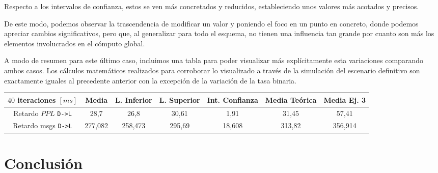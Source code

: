 \documentclass{article}[10pt]
\begin{document}
		Respecto a los intervalos de confianza, estos se ven más concretados y reducidos, estableciendo unos valores más acotados y precisos.

		De este modo, podemos observar la trascendencia de modificar un valor y poniendo el foco en un punto en concreto, donde podemos apreciar cambios significativos, pero que, al generalizar para todo el esquema, no tienen una influencia tan grande por cuanto son más los elementos involucrados en el cómputo global.

		A modo de resumen para este último caso, incluimos una tabla para poder visualizar más explícitamente esta variaciones comparando ambos casos. Los cálculos matemáticos realizados para corroborar lo visualizado a través de la simulación del escenario definitivo son exactamente iguales al precedente anterior con la excepción de la variación de la tasa binaria.

		\vskip 3mm

		\begin{center}
			\begin{tabular}{| c | c | c | c | c | c | c |}
						\hline
						$40$ iteraciones $[ms]$ & Media & L. Inferior & L. Superior & Int. Confianza & Media Teórica & Media Ej. 3\\
						\hline
						Retardo $PPL$ \texttt{D->L} & 28,7 & 26,8 & 30,61 & 1,91 & 31,45 & 57,41\\
						\hline
						Retardo msgs \texttt{D->L} & 277,082 & 258,473 & 295,69 & 18,608 & 313,82 & 356,914\\
						\hline
			\end{tabular}
		\end{center}

	\section{Conclusión}
\end{document}

